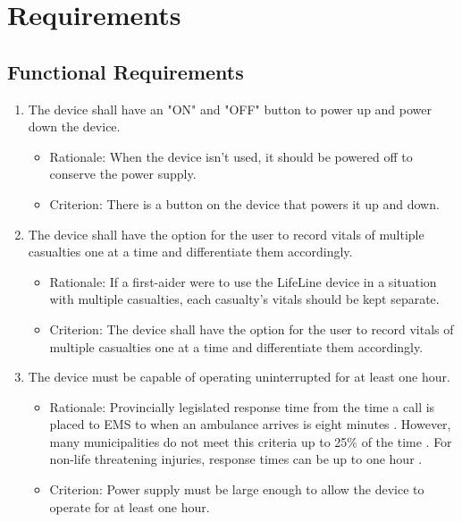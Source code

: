 \documentclass{article}
\begin{document}
    \newpage
    \section{Requirements}
    \subsection{Functional Requirements}

     \begin{enumerate}[label = \textbf{{FR}\arabic*}  ]
     
         \item The device shall have an "ON" and "OFF" button to power up and power down the device.
    	  	    \begin{itemize}
    	  	        \item Rationale:  When the device isn't used, it should be powered off to conserve the power supply.  
    	  	        \item Criterion: There is a button on the device that powers it up and down.
    	  	    \end{itemize}
    	  	    
    	 \item The device shall have the option for the user to record vitals of multiple casualties one at a time and differentiate them accordingly.
	  	    \begin{itemize}
	  	        \item Rationale:  If a first-aider were to use the LifeLine device in a situation with multiple casualties, each casualty's vitals should be kept separate.   
	  	        \item Criterion: The device shall have the option for the user to record vitals of multiple casualties one at a time and differentiate them accordingly.
	  	    \end{itemize}
	  	
	  	\item \label{power_1} The device must be capable of operating uninterrupted for at least one hour.
	        \begin{itemize}
	            \item Rationale: Provincially legislated response time from the time a call is placed to EMS to when an ambulance arrives is eight minutes \citep{responsetime1}.  However, many municipalities do not meet this criteria up to 25\% of the time \citep{responsetime3} \citep{responsetime2}.  For non-life threatening injuries, response times can be up to one hour \citep{responsetime3}.   
	            \item Criterion: Power supply must be large enough to allow the device to operate for at least one hour. 
	        \end{itemize}     
	   

\end{enumerate}
\end{document}
